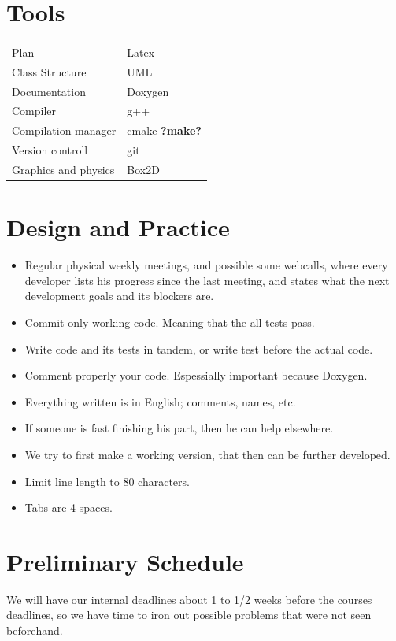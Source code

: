 \documentclass{article}
\begin{document}
\section{Tools}
\begin{tabular}{ll}
Plan                    & Latex \\
Class Structure         & UML \\
Documentation           & Doxygen \\
Compiler                & g++ \\
Compilation manager     & cmake \textbf{?make?} \\
Version controll        & git \\
Graphics and physics    & Box2D \\
\end{tabular}



\section{Design and Practice}
\begin{itemize}
\item Regular physical weekly meetings, and possible some webcalls,
where every developer lists his progress since the last meeting,
and states what the next development goals and its blockers are.
\item Commit only working code. Meaning that the all tests pass.
\item Write code and its tests in tandem, or write test before the actual code.
\item Comment properly your code. Espessially important because Doxygen.
\item Everything written is in English; comments, names, etc.
\item If someone is fast finishing his part, then he can help elsewhere.
\item We try to first make a working version, that then can be further
developed.
\item Limit line length to 80 characters.
\item Tabs are 4 spaces.
\end{itemize}



\section{Preliminary Schedule}
We will have our internal deadlines about 1 to 1/2 weeks before the
courses deadlines, so we have time to iron out possible problems that
were not seen beforehand.
\end{document}
